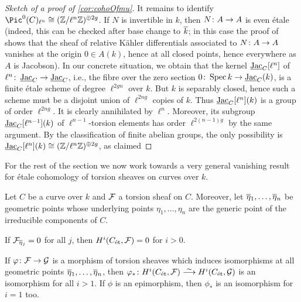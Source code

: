 \begin{proof}[Sketch of a proof of \cref{cor:cohoOfmu}]
	It remains to identify $\Pic^0(C)_{\ell^n}\cong (\IZ/\ell^n\IZ)^{\oplus 2g}$. If $N$ is invertible in $k$, then $N\colon A\morphism A$ is even étale (indeed, this can be checked after base change to $\ov{k}$; in this case the proof of \cite[Corollary~3.2.4]{jacobians} shows that the sheaf of relative Kähler differentials associated to $N\colon A\morphism A$ vanishes at the origin $0\in A(k)$, hence at all closed points, hence everywhere as $A$ is Jacobson). In our concrete situation, we obtain that the kernel $\operatorname{\underline{\smash{\mathrm{Jac}}}}_C[\ell^n]$ of $\ell^n\colon \JAC_C\morphism\JAC_C$, i.e., the fibre over the zero section $0\colon \Spec k\morphism \JAC_C(k)$, is a finite étale scheme of degree $\ell^{2gn}$ over $k$. But $k$ is separably closed, hence such a scheme must be a disjoint union of $\ell^{2ng}$ copies of $k$. Thus $\operatorname{\underline{\smash{\mathrm{Jac}}}}_C[\ell^n](k)$ is a group of order $\ell^{2ng}$. It is clearly annihilated by $\ell^n$. Moreover, its subgroup $\operatorname{\underline{\smash{\mathrm{Jac}}}}_C[\ell^{n-1}](k)$ of $\ell^{n-1}$-torsion elements has order $\ell^{2(n-1)g}$ by the same argument. By the classification of finite abelian groups, the only possibility is $\operatorname{\underline{\smash{\mathrm{Jac}}}}_C[\ell^n](k)\cong (\mathbb{Z}/\ell^n\mathbb{Z})^{\oplus 2g}$, as claimed
\end{proof}
For the rest of the section we now work towards a very general vanishing result for étale cohomology of torsion sheaves on curves over $k$.
\begin{fact}\label{fact:genericCohomologyVanishing}
	Let $C$ be a curve over $k$ and $\mathcal{F}$ a torsion sheaf on $C$. Moreover, let $\ov{\eta}_1,\dotsc,\ov{\eta}_n$ be geometric points whose underlying points $\eta_1,\dotsc,\eta_n$ are the generic point of the irreducible components of $C$. 
	\begin{alphanumerate}
		\item If $\Ff_{\ov{\eta}_j}=0$ for all $j$, then $H^i(C_{\mathrm{\acute{e}t}},\mathcal{F})=0$ for $i>0$.
		\item If $\phi\colon \Ff\morphism \Gg$ is a morphism of torsion sheaves which induces isomorphisms at all geometric points $\ov{\eta}_1,\dotsc,\ov{\eta}_n$, then $\phi_*\colon H^i(C_\et,\Ff)\isomorphism H^i(C_\et,\Gg)$ is an isomorphism for all $i>1$. If $\phi$ is an epimorphism, then $\phi_*$ is an isomorphism for $i=1$ too.
	\end{alphanumerate}
\end{fact}
